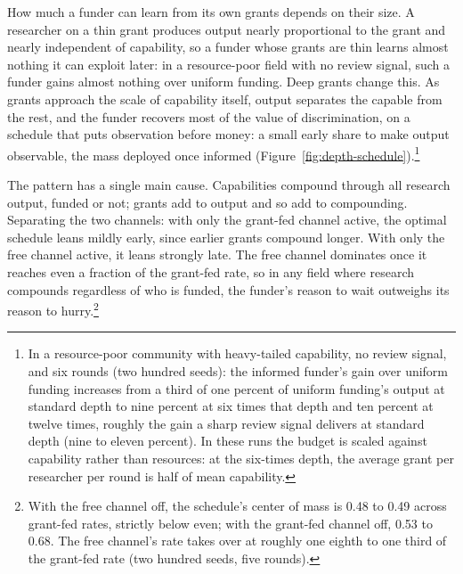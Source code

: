 \documentclass[article, 11pt, reqno]{amsart}
\theoremstyle{named}
\begin{document}


How much a funder can learn from its own grants depends on their size. A researcher on
a thin grant produces output nearly proportional to the grant and nearly independent
of capability, so a funder whose grants are thin learns almost nothing it can exploit
later: in a resource-poor field with no review signal, such a funder gains almost
nothing over uniform funding. Deep grants change this. As grants approach the scale of
capability itself, output separates the capable from the rest, and the funder recovers
most of the value of discrimination, on a schedule that puts observation before money:
a small early share to make output observable, the mass deployed once informed
(Figure~\ref{fig:depth-schedule}).\footnote{In a resource-poor community with
heavy-tailed capability, no review signal, and six rounds (two hundred seeds): the
informed funder's gain over uniform funding increases from a third of one percent of
uniform funding's output at standard depth to nine percent at six times that depth and
ten percent at twelve times, roughly the gain a sharp review signal delivers at
standard depth (nine to eleven percent). In these runs the budget is scaled against
capability rather than resources: at the six-times depth, the average grant per
researcher per round is half of mean capability.}



The pattern has a single main cause. Capabilities compound through all research
output, funded or not; grants add to output and so add to compounding. Separating the
two channels: with only the grant-fed channel active, the optimal schedule leans
mildly early, since earlier grants compound longer. With only the free channel active,
it leans strongly late. The free channel dominates once it reaches even a fraction of
the grant-fed rate, so in any field where research compounds regardless of who is
funded, the funder's reason to wait outweighs its reason to hurry.\footnote{With the
free channel off, the schedule's center of mass is 0.48 to 0.49 across grant-fed
rates, strictly below even; with the grant-fed channel off, 0.53 to 0.68. The free
channel's rate takes over at roughly one eighth to one third of the grant-fed rate
(two hundred seeds, five rounds).}
\end{document}
